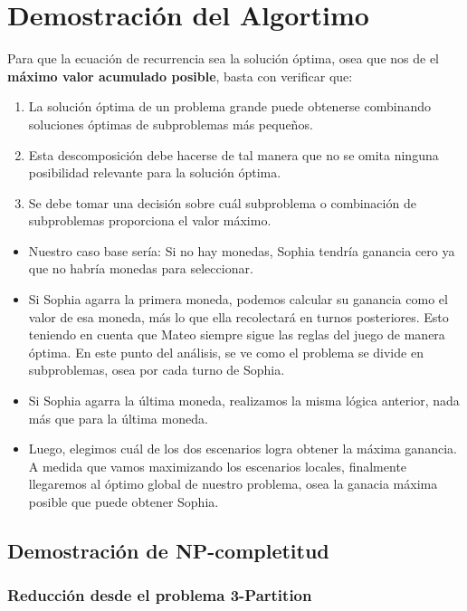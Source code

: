 \section{Demostración del Algortimo}

Para que la ecuación de recurrencia sea la solución óptima, osea que nos de el \textbf{máximo valor acumulado posible}, basta con verificar que:

\begin{enumerate}
    \item La solución óptima de un problema grande puede obtenerse combinando soluciones óptimas de subproblemas más pequeños.
    \item Esta descomposición debe hacerse de tal manera que no se omita ninguna posibilidad relevante para la solución óptima.
    \item Se debe tomar una decisión sobre cuál subproblema o combinación de subproblemas proporciona el valor máximo.
\end{enumerate}



\begin{itemize}
    \item Nuestro caso base sería: Si no hay monedas, Sophia tendría ganancia cero ya que no habría monedas para seleccionar.
    \item Si Sophia agarra la primera moneda, podemos calcular su ganancia como el valor de esa moneda, más lo que ella recolectará en turnos posteriores. Esto teniendo en cuenta
    que Mateo siempre sigue las reglas del juego de manera óptima. En este punto del análisis, se ve como el problema se divide en subproblemas, osea por cada turno de Sophia.
    \item Si Sophia agarra la última moneda, realizamos la misma lógica anterior, nada más que para la última moneda.
    \item Luego, elegimos cuál de los dos escenarios logra obtener la máxima ganancia. A medida que vamos maximizando los escenarios locales, finalmente llegaremos al óptimo global de nuestro problema, osea la ganacia máxima posible que puede obtener Sophia.
    \end{itemize}


\subsection{Demostración de NP-completitud}

\subsubsection*{Reducción desde el problema 3-Partition}

